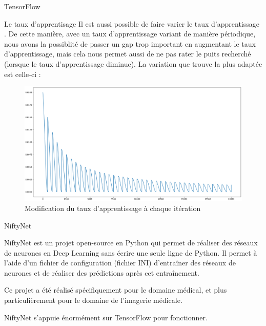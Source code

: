 \documentclass{book}
\newcommand{\p}{\vspace{0.2cm}}
\begin{document}
\begin{chapter}{TensorFlow}
\begin{section}{Le taux d'apprentisage}
			Il est aussi possible de faire varier le taux d'apprentissage \cite{lr}. De cette manière, avec un taux d'apprentissage variant de manière périodique, nous avons la possiblité de passer un gap trop important en augmentant le taux d'apprentissage, mais cela nous permet aussi de ne pas rater le puits recherché (lorsque le taux d'apprentissage diminue). La variation que \cite{lr} trouve la plus adaptée est celle-ci :
			\begin{figure}
				\begin{center}
					\includegraphics[scale=0.25]{annex/lr_modification}
					\caption{Modification du taux d'apprentissage à chaque itération}
					\label{ModLR}
				\end{center}
			\end{figure}

		\end{section}

  \end{chapter}

  \begin{chapter}{NiftyNet}

    NiftyNet est un projet open-source en Python qui permet de réaliser des réseaux de neurones en Deep Learning sans écrire une seule ligne de Python. Il permet à l'aide d'un fichier de configuration (fichier INI) d'entraîner des réseaux de neurones et de réaliser des prédictions après cet entraînement.\p

    Ce projet a été réalisé spécifiquement pour le domaine médical, et plus particulièrement pour le domaine de l'imagerie médicale.\p

    NiftyNet s'appuie énormément sur TensorFlow pour fonctionner.\p

  \end{chapter}

  \nocite{*}
  
  
\end{document}

